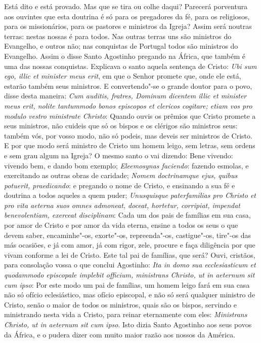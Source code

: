 Está dito e está provado. Mas que se tira ou colhe daqui? Parecerá
porventura aos ouvintes que esta doutrina é só para os pregadores da fé,
para os religiosos, para os missionários, para os pastores e ministros
da Igreja? Assim será noutras terras: nestas nossas é para todos. Nas
outras terras uns são ministros do Evangelho, e outros não; nas
conquistas de Portugal todos são ministros do Evangelho. Assim o disse
Santo Agostinho pregando na África, que também é uma das nossas
conquistas. Explicava o santo aquela sentença de Cristo: \emph{Ubi sum
ego, illic et minister meus erit}, em que o Senhor promete %
que, onde ele está, estarão também seus ministros. E convertendo"-se o
grande doutor para o povo, disse desta maneira: \emph{Cum auditis,
fratres, Dominum dicentem illic et minister meus erit, nolite tantummodo
bonos episcopos et clericos cogitare; etiam vos pro modulo vestro
ministrate Christo}: Quando ouvis os prêmios que Cristo promete a seus
ministros, não cuideis que só os bispos e os clérigos são ministros
seus: também vós, por vosso modo, não só podeis, mas deveis ser
ministros de Cristo. E por que modo será ministro de Cristo um homem
leigo, sem letras, sem ordens e sem grau algum na Igreja? O mesmo santo
o vai dizendo: Bene vivendo: vivendo bem, e dando bom exemplo;
\emph{Eleemosynas faciendo}: fazendo esmolas, e exercitando as outras
obras de caridade; \emph{Nomem doctrinamque ejus, quibus potuerit,
praedicando}: e pregando o nome de Cristo, e ensinando a sua fé e
doutrina a todos aqueles a quem puder; \emph{Unusquisque paterfamilias
pro Christo et pro vita aeterna suos omnes admoneat, doceat, hortetur,
corripiat, impendat benevolentiam, exerceat disciplinam}: Cada um dos
pais de famílias em sua casa, por amor de Cristo e por amor da vida
eterna, ensine a todos os seus o que devem saber, encaminhe"-os,
exorte"-os, repreenda"-os, castigue"-os, tire"-os das más ocasiões, e já com
amor, já com rigor, zele, procure e faça diligência por que vivam
conforme a lei de Cristo.
Este tal pai de famílias, que será? Ouvi, cristãos, para consolação
vossa o que conclui Agostinho: \emph{Ita in domo sua ecclesiasticum et
quodammodo episcopale implebit officium, ministrans Christo, ut in
aeternum sit cum ipso}: Por este modo um pai de famílias, um homem leigo
fará em sua casa não só ofício eclesiástico, mas ofício episcopal, e não
só será qualquer ministro de Cristo, senão o maior de todos os
ministros, quais são os bispos, servindo e ministrando nesta vida a
Cristo, para reinar eternamente com eles: \emph{Ministrans Christo, ut
in aeternum sit cum ipso}. Isto dizia Santo Agostinho aos seus povos da
África, e o pudera dizer com muito maior razão aos nossos da América.

